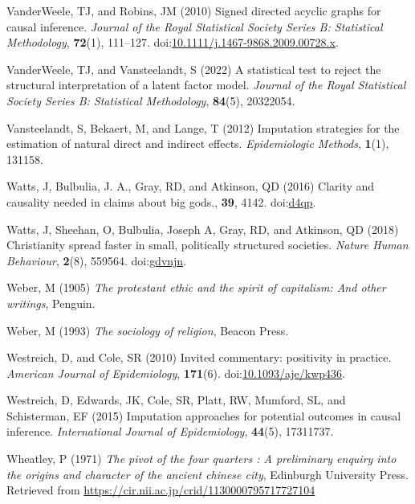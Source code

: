\documentclass[
  singlecolumn]{article}
\newlength{\cslhangindent}
\newenvironment{CSLReferences}[2] %
 {\begin{list}{}{%
  \setlength{\itemindent}{0pt}
  \setlength{\leftmargin}{0pt}
  \setlength{\parsep}{0pt}
  \ifodd #1
   \setlength{\leftmargin}{\cslhangindent}
   \setlength{\itemindent}{-1\cslhangindent}
  \fi
  \setlength{\itemsep}{#2\baselineskip}}}
 {\end{list}}
\begin{document}
\begin{CSLReferences}{1}{0}
VanderWeele, TJ, and Robins, JM (2010) Signed directed acyclic graphs
for causal inference. \emph{Journal of the Royal Statistical Society
Series B: Statistical Methodology}, \textbf{72}(1), 111--127.
doi:\href{https://doi.org/10.1111/j.1467-9868.2009.00728.x}{10.1111/j.1467-9868.2009.00728.x}.

VanderWeele, TJ, and Vansteelandt, S (2022) A statistical test to reject
the structural interpretation of a latent factor model. \emph{Journal of
the Royal Statistical Society Series B: Statistical Methodology},
\textbf{84}(5), 20322054.

Vansteelandt, S, Bekaert, M, and Lange, T (2012) Imputation strategies
for the estimation of natural direct and indirect effects.
\emph{Epidemiologic Methods}, \textbf{1}(1), 131158.

Watts, J, Bulbulia, J. A., Gray, RD, and Atkinson, QD (2016) Clarity and
causality needed in claims about big gods., \textbf{39}, 4142.
doi:\href{https://doi.org/d4qp}{d4qp}.

Watts, J, Sheehan, O, Bulbulia, Joseph A, Gray, RD, and Atkinson, QD
(2018) Christianity spread faster in small, politically structured
societies. \emph{Nature Human Behaviour}, \textbf{2}(8), 559564.
doi:\href{https://doi.org/gdvnjn}{gdvnjn}.

Weber, M (1905) \emph{The protestant ethic and the spirit of capitalism:
And other writings}, Penguin.

Weber, M (1993) \emph{The sociology of religion}, Beacon Press.

Westreich, D, and Cole, SR (2010) Invited commentary: positivity in
practice. \emph{American Journal of Epidemiology}, \textbf{171}(6).
doi:\href{https://doi.org/10.1093/aje/kwp436}{10.1093/aje/kwp436}.

Westreich, D, Edwards, JK, Cole, SR, Platt, RW, Mumford, SL, and
Schisterman, EF (2015) Imputation approaches for potential outcomes in
causal inference. \emph{International Journal of Epidemiology},
\textbf{44}(5), 17311737.

Wheatley, P (1971) \emph{The pivot of the four quarters : A preliminary
enquiry into the origins and character of the ancient chinese city},
Edinburgh University Press. Retrieved from
\url{https://cir.nii.ac.jp/crid/1130000795717727104}


\end{CSLReferences}
\end{document}
